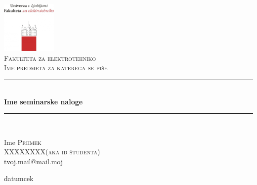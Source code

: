\begin{titlepage}
\begin{center}
\newcommand{\HRule}{\rule{\linewidth}{0.5mm}}

\includegraphics[width=0.20\textwidth]{logo_fe.jpg}\\[1cm]
\textsc{\LARGE Fakulteta za elektrotehniko}\\[1.5cm]
\textsc{\Large Ime predmeta za katerega se piše}\\[0.5cm]

\HRule \\[0.5cm]
{ \huge \bfseries Ime seminarske naloge}\\[0.2cm]
\HRule \\[1.5cm]
\end{center}
Ime \textsc{Priimek\\XXXXXXXX(aka id študenta)}\\
tvoj.mail@mail.moj
\begin{center}
\vfill

{\large datumcek}
\end{center}
\end{titlepage}
